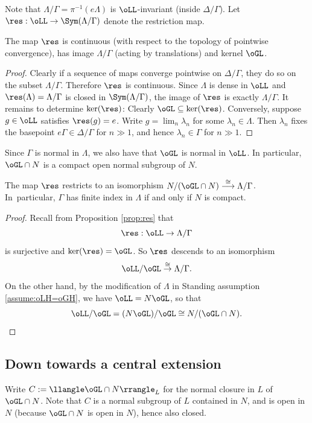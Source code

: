 Note that $\Lambda / \Gamma = \pi^{-1}(e\Lambda)$ is $\oLL$-invariant (inside $\Delta / \Gamma$). Let $\res:\oLL\to \Sym(\Lambda/\Gamma)$ denote the restriction map.
\begin{prop}\label{prop:res}
The map $\res$ is continuous (with respect to the topology of pointwise convergence), has image $\Lambda/\Gamma$ (acting by translations) and kernel $\oGL$.
\end{prop}
\begin{proof} Clearly if a sequence of maps converge pointwise on $\Delta/\Gamma$, they do so on the subset $\Lambda/\Gamma$. Therefore $\res$ is continuous. Since $\Lambda$ is dense in $\oLL$ and $\res(\Lambda)=\Lambda/\Gamma$ is closed in $\Sym(\Lambda/\Gamma)$, the image of $\res$ is exactly $\Lambda/\Gamma$. It remains to determine $\ker(\res)$: Clearly $\oGL\subseteq \ker(\res)$. Conversely, suppose $g\in\oLL$ satisfies $\res(g)=e$. Write $g=\lim_n \lambda_n$ for some $\lambda_n\in\Lambda$. Then $\lambda_n$ fixes the basepoint $e\Gamma\in\Delta/\Gamma$ for $n \gg 1$, and hence $\lambda_n\in\Gamma$ for $n \gg 1$.\end{proof}
Since $\Gamma$ is normal in $\Lambda$, we also have that $\oGL$ is normal in $\oLL$. In particular, $\oGL\cap N$ is a compact open normal subgroup of $N$.

\begin{claim}\label{claim:res-res-iso}
The map $\res$ restricts to an isomorphism $N/(\oGL\cap N)\overset{\cong}{\longrightarrow} \Lambda/\Gamma$. In~particular, $\Gamma$ has finite index in $\Lambda$ if and only if $N$ is compact.
\end{claim}
\begin{proof} Recall from Proposition \ref{prop:res} that
\[
\res:\oLL\to \Lambda/\Gamma
\]
is surjective and $\ker(\res)=\oGL$. So $\res$ descends to an isomorphism
\[
\oLL/\oGL\overset{\cong}{\to} \Lambda/\Gamma.
\]
On the other hand, by the modification of $\Lambda$ in Standing assumption \ref{assume:oLH=oGH}, we have $\oLL=N\oGL$, so that
\[
\oLL/\oGL = (N\oGL)/\oGL \cong N/(\oGL\cap N).\qedhere
\]
\end{proof}

\subsection{Down towards a central extension}\label{sec:down}
Write $C:= \llangle \oGL\cap N\rrangle_L$ for the normal closure in $L$ of $\oGL\cap N$. Note that $C$ is a normal subgroup of $L$ contained in $N$, and is open in $N$ (because $\oGL\cap N$ is open in $N$), hence also closed.

